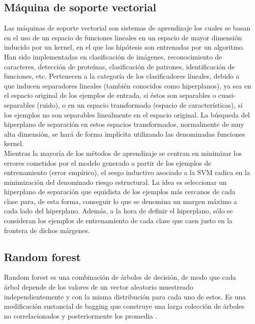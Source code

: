 \subsection{Máquina de soporte vectorial}

Las máquinas de soporte vectorial son sistemas de aprendizaje los
cuales se basan en el uso de un espacio de funciones lineales en un espacio de mayor dimensión inducido
por un kernel, en el que las hipótesis son entrenadas por un algoritmo\citep{CT8}.
Han sido implementadas en clasificación de imágenes, reconocimiento de caracteres, detección de
proteínas, clasificación de patrones, identificación de funciones, etc.
Pertenecen a la categoría de los clasificadores lineales, debido a que inducen separadores lineales
(también conocidos como hiperplanos), ya sea en el espacio original de los ejemplos de entrada, si éstos son separables o cuasi-separables (ruido), o en un espacio transformado (espacio de características),
si los ejemplos no son separables linealmente en el espacio original. La búsqueda del hiperplano
de separación en estos espacios transformados, normalmente de muy alta dimensión, se hará de forma
implícita utilizando las denominadas funciones kernel.\\ 

Mientras la mayoría de los métodos de aprendizaje
se centran en minimizar los errores cometidos por el modelo generado a partir de los ejemplos
de entrenamiento (error empírico), el sesgo inductivo asociado a la SVM radica en la minimización
del denominado riesgo estructural.
La idea es seleccionar un hiperplano de separación que equidista de los ejemplos más cercanos de
cada clase para, de esta forma, conseguir lo que se denomina un margen máximo a cada lado del hiperplano.
Además, a la hora de definir el hiperplano, sólo se consideran los ejemplos de entrenamiento
de cada clase que caen justo en la frontera de dichos márgenes. 

\subsection{Random forest}

Random forest es una combinación de árboles de decisión, de modo que cada árbol depende de los valores de un vector 
aleatorio muestreado independientemente y con la misma distribución para cada uno de estos. Es una modificación sustancial de bagging que construye una 
larga colección de árboles no correlacionados y posteriormente los promedia \citep{CT9}.\\


